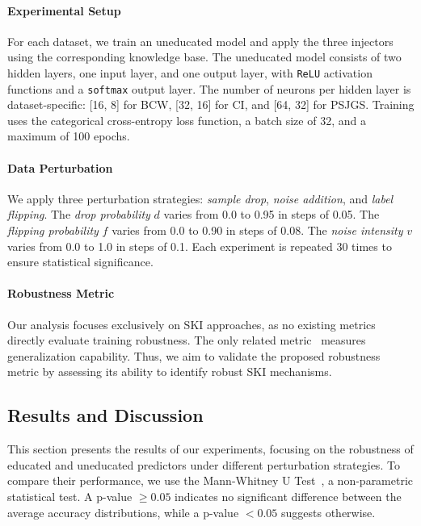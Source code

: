 %
\paragraph{Experimental Setup}
%
For each dataset, we train an uneducated model and apply the three injectors using the corresponding knowledge base.
%
The uneducated model consists of two hidden layers, one input layer, and one output layer, with \texttt{ReLU} activation functions and a \texttt{softmax} output layer.
%
The number of neurons per hidden layer is dataset-specific: [16, 8] for \gls{BCW}, [32, 16] for \gls{CI}, and [64, 32] for \gls{PSJGS}.
%
Training uses the categorical cross-entropy loss function, a batch size of 32, and a maximum of 100 epochs.

%
\paragraph{Data Perturbation}
%
We apply three perturbation strategies: \emph{sample drop}, \emph{noise addition}, and \emph{label flipping}.
%
The \emph{drop probability} \(d\) varies from 0.0 to 0.95 in steps of 0.05.
%
The \emph{flipping probability} \(f\) varies from 0.0 to 0.90 in steps of 0.08.
%
The \emph{noise intensity} \(v\) varies from 0.0 to 1.0 in steps of 0.1.
%
Each experiment is repeated 30 times to ensure statistical significance.

%
\paragraph{Robustness Metric}
%
Our analysis focuses exclusively on \gls{SKI} approaches, as no existing metrics directly evaluate training robustness.
%
The only related metric~\cite{placeholder} measures generalization capability.
%
Thus, we aim to validate the proposed robustness metric by assessing its ability to identify robust \gls{SKI} mechanisms.


\subsection{Results and Discussion}\label{subsec:empirical-study-on-the-robustness-of-ski-methods-results-and-discussion}
%

%
%

%
This section presents the results of our experiments, focusing on the robustness of educated and uneducated predictors under different perturbation strategies.
%
To compare their performance, we use the Mann-Whitney U Test~\cite{placeholder}, a non-parametric statistical test.
%
A p-value \(\geq 0.05\) indicates no significant difference between the average accuracy distributions, while a p-value \(< 0.05\) suggests otherwise.
%
